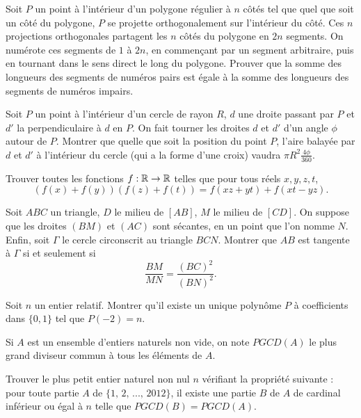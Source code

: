\begin{exo}{ }
Soit $P$ un point à l'intérieur d'un polygone régulier à $n$ côtés tel que quel que soit un côté du polygone, $P$ se projette orthogonalement sur l'intérieur du côté. Ces $n$ projections orthogonales partagent les $n$ côtés du polygone en $2n$ segments. On numérote ces segments de $1$ à $2n$, en commençant par un segment arbitraire, puis en tournant dans le sens direct le long du polygone. Prouver que la somme des longueurs des segments de numéros pairs est égale à la somme des longueurs des segments de numéros impairs.
\end{exo}

\begin{exo}{}Soit $P$ un point à l'intérieur d'un cercle de rayon $R$, $d$ une droite passant par $P$ et $d'$ la perpendiculaire à $d$ en $P$. On fait tourner les droites $d$ et $d'$ d'un angle $\phi$ autour de $P$. Montrer que quelle que soit la position du point $P$, l'aire balayée par $d$ et $d'$ à l'intérieur du cercle (qui a la forme d'une croix) vaudra $\pi R^2 \frac{4\phi}{360}$.
\end{exo}

\begin{exo}{}Trouver toutes les fonctions $f : \mathbb R \rightarrow \mathbb R$ telles que pour tous réels $x,y,z,t$,
$$(f(x)+f(y))(f(z)+f(t))=f(xz+yt)+f(xt-yz).$$
\end{exo}

\begin{exo}{}
Soit $ABC$ un triangle, $D$ le milieu de $[AB]$, $M$ le milieu de $[CD]$. On suppose
que les droites $(BM)$ et $(AC)$ sont sécantes, en un point que l'on nomme $N$.
Enfin, soit $\Gamma$ le cercle circonscrit au triangle $BCN$.
Montrer que $AB$ est tangente à $\Gamma$ si et seulement si $$\frac{BM}{MN}
= \frac{(BC)^2}{(BN)^2}.$$
\end{exo}


\begin{exo}{}
Soit $n$ un entier relatif. Montrer qu'il existe un unique polynôme $P$ à coefficients
dans $\lbrace 0, 1 \rbrace$  tel que $P(-2)=n$.
\end{exo}

\begin{exo}{}
Si $A$ est un ensemble d'entiers naturels non vide, on note $PGCD(A)$ le plus grand diviseur commun \`a tous les \'el\'ements de $A$.

Trouver le plus petit entier naturel non nul $n$ v\'erifiant la propri\'et\'e suivante : pour toute partie $A$ de $\{1, \, 2, \, ..., \, 2012\}$, il existe une partie $B$ de $A$ de cardinal inf\'erieur ou \'egal \`a $n$ telle que $PGCD(B) = PGCD(A)$.
\end{exo}



